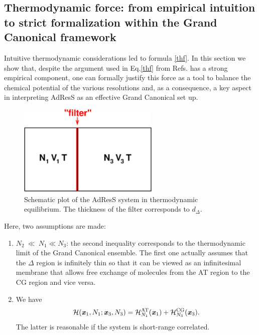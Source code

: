 \documentclass[aip,jcp,a4paper,reprint,onecolumn]{revtex4-1}
\newcommand{\vect}[1]{\textbf{\textit{#1}}}
\newcommand{\AT}{{\textrm{{AT}}}}
\newcommand{\CG}{{\textrm{CG}}}
\newcommand{\HY}{{\Delta}}
\begin{document}
\subsection{Thermodynamic force: from empirical intuition to strict formalization within the Grand Canonical framework}
Intuitive thermodynamic considerations led to formula \eqref{thf}. In this section we show that, despite the argument used in Eq.\ref{thf} from Refs.\cite{prlgc,rdfcorr} has a strong empirical component, one can formally justify this force
as a tool to balance the chemical potential of the various resolutions and, as a consequence,  a key aspect in interpreting AdResS as an effective Grand Canonical set up. 
\begin{figure}
  \centering
  \begin{minipage}[t]{0.49\linewidth}
  \includegraphics[width=0.6\textwidth]{fig.grand/partition.eps}    
  \end{minipage}
  \caption{Schematic plot of the AdResS system in thermodynamic equilibrium. The thickness of the filter corresponds to $d_{\Delta}$.}
  \label{fig:tmp1}
\end{figure}
Here, two assumptions are made:
\begin{enumerate}
\item $N_2\ {\ll}\ N_1 \ll N_3$: the second inequality corresponds to
  the thermodynamic limit of the Grand Canonical ensemble. The first
  one actually assumes that the $\HY$ region is infinitely thin so that it
  can be viewed as an infinitesimal membrane that allows free exchange of molecules from
  the AT region to the CG region and vice versa.
\item We have 
  \begin{equation}
    \mathcal H(\vect x_1, N_1; \vect x_3, N_3) =
    \mathcal H_{N_1}^{\AT}(\vect x_1) + \mathcal H_{N_3}^{\CG}(\vect x_3). 
  \end{equation}
  The latter is reasonable if the system is
  short-range correlated.
  
\end{enumerate}
\end{document}
